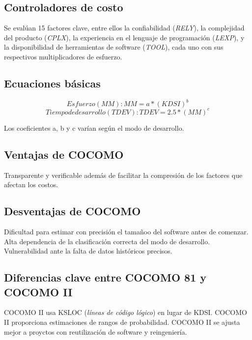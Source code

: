 \subsection*{Controladores de costo}
\noindent Se eval\'uan 15 factores clave, entre ellos la confiabilidad (\textit{RELY}), la complejidad del producto (\textit{CPLX}), la
experiencia en el lenguaje de programaci\'on (\textit{LEXP}), y la disponibilidad de herramientas de software (\textit{TOOL}), cada uno
con sus respectivos multiplicadores de esfuerzo.

\subsection*{Ecuaciones b\'asicas}

$$ Esfuerzo (MM): MM=a*(KDSI)^b $$
$$ Tiempo de desarrollo (TDEV): TDEV=2.5*(MM)^c $$

\noindent Los coeficientes a, b y c var\'ian seg\'un el modo de desarrollo.

\subsection*{Ventajas de COCOMO}
\noindent Transparente y verificable además de facilitar la compresi\'on de los factores que afectan los costos.

\subsection*{Desventajas de COCOMO}
\noindent Dificultad para estimar con precisi\'on el tamañoo del software antes de comenzar. Alta dependencia de la clasificaci\'on correcta
del modo de desarrollo. Vulnerabilidad ante la falta de datos hist\'oricos precisos.

\subsection*{Diferencias clave entre COCOMO 81 y COCOMO II}
\noindent COCOMO II usa KSLOC (\textit{l\'ineas de c\'odigo l\'ogico}) en lugar de KDSI. COCOMO II proporciona estimaciones de rangos de
probabilidad. COCOMO II  se ajusta mejor a proyctos con reutilizaci\'on de software y reingenier\'ia.
